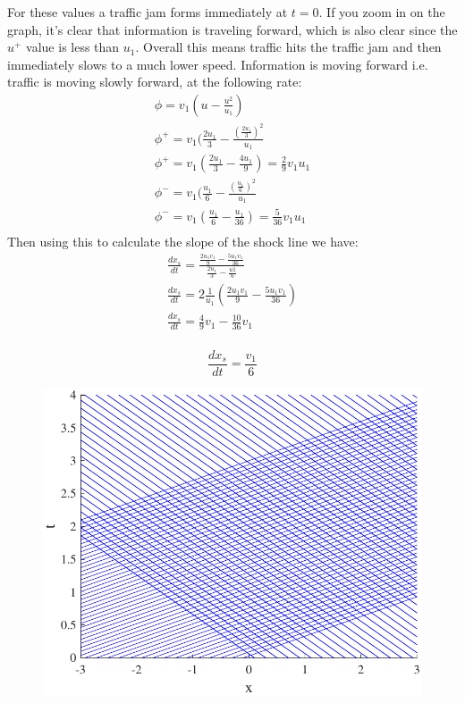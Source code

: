 \documentclass{article}
\begin{document}
For these values a traffic jam forms immediately at $t=0$. If you zoom in on the graph, it's clear that information is traveling forward, which is also clear since the $u^+$ value is less than $u_1$. Overall this means traffic hits the traffic jam and then immediately slows to a much lower speed. Information is moving forward i.e. traffic is moving slowly forward, at the following rate:
\begin{equation}
\begin{aligned}
\phi = v_1(u - \frac{u^2}{u_1})\\
\phi^+ = v_1(\frac{2u_1}{3} - \frac{(\frac{2u_1}{3})^2}{u_1}\\
\phi^+ = v_1(\frac{2u_1}{3} - \frac{4u_1}{9}) = \frac{2}{9}v_1u_1\\
\phi^- = v_1(\frac{u_1}{6} - \frac{(\frac{u_1}{6})^2}{u_1}\\
\phi^- = v_1(\frac{u_1}{6} - \frac{u_1}{36}) = \frac{5}{36}v_1u_1\\
\end{aligned}
\end{equation}
Then using this to calculate the slope of the shock line we have:
\begin{equation}
\begin{aligned}
\frac{dx_s}{dt} = \frac{\frac{2u_1v_1}{9} - \frac{5u_1v_1}{36}}{\frac{2u_1}{3} - \frac{u1}{6}}\\
\frac{dx_s}{dt} = 2\frac{1}{u_1}( \frac{2u_1v_1}{9} - \frac{5u_1v_1}{36})\\
\frac{dx_s}{dt} = \frac{4}{9}v_1 - \frac{10}{36}v_1\\
\end{aligned}
\end{equation}
\begin{tcolorbox}[minipage,colback=white,arc=0pt,outer arc=0pt]
\begin{equation}
\frac{dx_s}{dt} = \frac{v_1}{6}
\end{equation}
\end{tcolorbox}
\begin{figure}[!htbp]
  \centering
    \includegraphics[width=.49\textwidth]{hw_14_plot15.pdf}
    \caption{}
\end{figure}
\FloatBarrier
\end{document}
